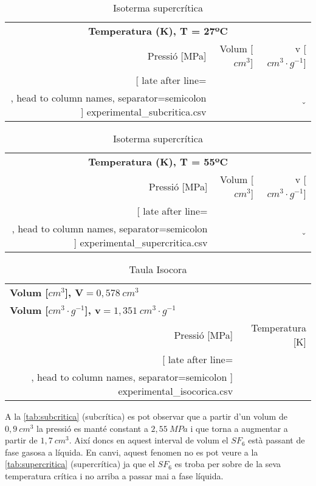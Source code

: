 \documentclass[a4paper]{article}
\begin{document}
\begin{table}[H]
	\begin{minipage}[t][8,3cm][b]{0.49\linewidth}
		\begin{tabular}{rrr}
			\multicolumn{3}{c}{\bf Temperatura (K), T = 27ºC} \\
			Pressió [MPa] & Volum [$cm^3$] & v [$cm^3 · g^{-1}$] \\
			\hline
			\csvreader[
					late after line=\\, 
					head to column names, separator=semicolon
				]
				{experimental_subcritica.csv}{}{\P & \V & \v }
		\end{tabular}
		\vfill
		\caption{Isoterma subcrítica}
		\label{tab:subcritica}
	\end{minipage}
	\begin{minipage}[t][8,3cm][b]{0.49\linewidth}
		\begin{tabular}{rrr}
			\multicolumn{3}{c}{\bf Temperatura (K), T = 55ºC} \\
			Pressió [MPa] & Volum [$cm^3$] & v [$cm^3 · g^{-1}$] \\
			\hline
			\csvreader[
					late after line=\\, 
					head to column names, separator=semicolon
				]
				{experimental_supercritica.csv}{}{\P & \V & \v }
		\end{tabular}
		\vfill
		\caption{Isoterma supercrítica}
		\label{tab:supercritica}
	\end{minipage}
\end{table}

\begin{table}[H]
	\centering
	\begin{tabular}{rr}
		\multicolumn{2}{l}{\textbf{Volum [$cm^3$], $\boldsymbol{V} = 0,578\ cm^3$ }} \\ 
		\multicolumn{2}{l}{\textbf{Volum [$cm^3 · g^{-1}$], $\boldsymbol{v} = 1,351\ cm^3·g^{-1}$ }}  \\
		Pressió [MPa] & Temperatura [K] \\
		\hline
		\csvreader[
				late after line=\\, 
				head to column names, separator=semicolon
			]
			{experimental_isocorica.csv}{}{ \P & \T }
	\end{tabular}
	\caption{Taula Isocora}
	\label{tab:isocora}
\end{table}

A la \autoref{tab:subcritica} (subcrítica) es pot observar que a partir d'un volum de $0,9\ cm^3$ la pressió es manté constant a $2,55\ MPa$ i que torna a augmentar a partir de $1,7\ cm^3$. Així doncs en aquest interval de volum el $SF_6$ està passant de fase gasosa a líquida. En canvi, aquest fenomen no es pot veure a la \autoref{tab:supercritica} (supercrítica) ja que el $SF_6$ es troba per sobre de la seva temperatura crítica i no arriba a passar mai a fase líquida.
\end{document}
